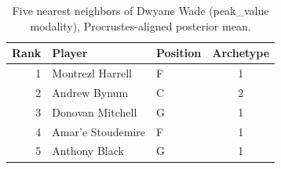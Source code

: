 \begin{table}[htbp]
  \centering\small
  \begin{tabular}{rllc}
    \toprule
    Rank & Player & Position & Archetype \\
    \midrule
    1 & Montrezl Harrell & F & 1 \\
    2 & Andrew Bynum & C & 2 \\
    3 & Donovan Mitchell & G & 1 \\
    4 & Amar'e Stoudemire & F & 1 \\
    5 & Anthony Black & G & 1 \\
    \bottomrule
  \end{tabular}
  \caption{Five nearest neighbors of Dwyane Wade (peak_value modality), Procrustes-aligned posterior mean.}
  \label{tab:Dwyane_Wade_neighbors_peak_value}
\end{table}

